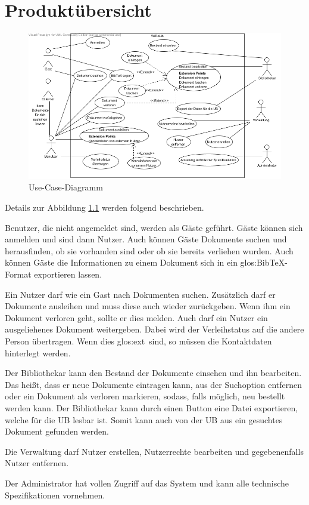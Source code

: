 \chapter{Produktübersicht}

\begin{figure}[h]
\centering
\includegraphics[width=0.8\linewidth]{bilder/use-case.png}
\caption[Use-Case-Diagramm]{Use-Case-Diagramm}
\label{use-case}
\end{figure}

Details zur Abbildung \ref{use-case}   werden folgend beschrieben.

Benutzer, die nicht angemeldet sind, werden als Gäste geführt.
Gäste können sich anmelden und sind dann Nutzer.
Auch können Gäste Dokumente suchen und herausfinden, ob sie vorhanden sind oder ob sie bereits verliehen wurden.
Auch können Gäste die Informationen zu einem Dokument sich in ein \gls{glos:BibTeX}-Format exportieren lassen.

Ein Nutzer darf wie ein Gast nach Dokumenten suchen.
Zusätzlich darf er Dokumente ausleihen und muss diese auch wieder zurückgeben.
Wenn ihm ein Dokument verloren geht, sollte er dies melden.
Auch darf ein Nutzer ein ausgeliehenes Dokument weitergeben.
Dabei wird der Verleihstatus auf die andere Person übertragen.
Wenn dies \gls{glos:ext}\ sind, so müssen die Kontaktdaten hinterlegt werden.

Der Bibliothekar kann den Bestand der Dokumente einsehen und ihn bearbeiten.
Das heißt, dass er neue Dokumente eintragen kann, aus der Suchoption entfernen oder ein Dokument als verloren markieren, sodass, falls möglich, neu bestellt werden kann.
Der Bibliothekar kann durch einen Button eine Datei exportieren, welche für die \gls{UB} lesbar ist.
Somit kann auch von der \gls{UB} aus ein gesuchtes Dokument gefunden werden.

Die Verwaltung darf Nutzer erstellen, Nutzerrechte bearbeiten und gegebenenfalls Nutzer entfernen.

Der Administrator hat vollen Zugriff auf das System und kann alle technische Spezifikationen vornehmen.

